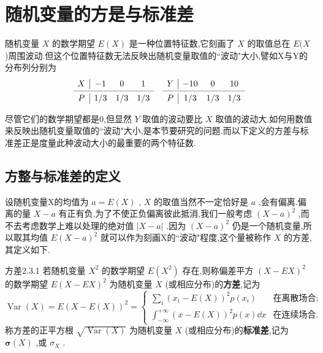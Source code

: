 \section{随机变量的方是与标准差}\label{sec:2.3}


随机变量 $ X $ 的数学期望 $ E(X) $ 是一种位置特征数,它刻画了 $ X $ 的取值总在 $ E(X $ )周围波动.但这个位置特征数无法反映出随机变量取值的``波动"大小,譬如X与Y的分布列分别为
\[
\begin{array}{c|ccccc|ccc}
X     & -1    & 0     & 1     &       & Y     & -10   & 0     & 10 \\
\cmidrule{1-4}\cmidrule{6-9}    P     & 1/3   & 1/3   & 1/3   &       & P     & 1/3   & 1/3   & 1/3 \\
\end{array}\]

尽管它们的数学期望都是0,但显然 $ Y $ 取值的波动要比 $ X $ 取值的波动大.如何用数值来反映出随机变量取值的``波动"大小,是本节要研究的问题.而以下定义的方差与标准差正是度量此种波动大小的最重要的两个特征数.

\subsection{方整与标准差的定义}\label{2.3.1}

设随机变量X的均值为 $ a=E(X) $ , $ X $ 的取值当然不一定恰好是 $ a $ ,会有偏离.偏离的量 $ X-a $ 有正有负,为了不使正负偏离彼此抵消,我们一般考虑 $ (X-a)^2 $ ,而不去考虑数学上难以处理的绝对值 $ |X-a| $ .因为 $ (X-a)^2 $ 仍是一个随机变量,所以取其均值 $ E(X-a)^2 $ 就可以作为刻画X的``波动"程度,这个量被称作 $ X $ 的方差,其定义如下.
\begin{definition}{方差}{2.3.1}
	若随机变量 $ X^2 $ 的数学期望 $ E(X^2) $ 存在,则称偏差平方 $ (X-EX)^2 $ 的数学期望 $ E(X-EX)^2 $ 为随机变量 $ X $ (或相应分布)的\textbf{方差},记为
	\begin{equation}
	\operatorname{Var}(X)=E(X-E(X))^{2}=\left\{\begin{array}{ll}
	{\sum_{i}\left(x_{i}-E(X)\right)^{2} p\left(x_{i}\right)} &{\text{在离散场合;}}\\
	{\int_{-\infty}^{+\infty}(x-E(X))^{2} p(x) \dd x} &{\text{在连续场合.}}
	\end{array}\right. \label{eq:2.3.1}
	\end{equation}
	称方差的正平方根 $ \sqrt{\operatorname{Var}(X)} $ 为随机变量 $ X $ (或相应分布)的\textbf{标准差},记为 $ \boldsymbol{\sigma}(X) $ ,或 $ \sigma_X $ .
\end{definition}

